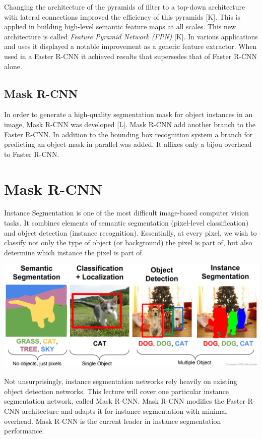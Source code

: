 Changing the architecture of the pyramids of filter to a top-down architecture with lateral connections improved the efficiency of this pyramids [K]. This is applied in building high-level semantic feature maps at all scales. This new architecture is called \emph{ Feature Pyramid Network (FPN)} [K]. In various applications and uses it displayed a notable improvement as a generic feature extractor. When used in a Faster R-CNN it achieved results that supersedes that of Faster R-CNN alone. 

\subsection{Mask R-CNN}\label{s:nnevo-maskrcnn}

In order to generate a high-quality segmentation mask for object instances in an image, Mask R-CNN was developed [L]. Mask R-CNN add another branch to the Faster R-CNN. In addition to the bounding box recognition system a branch for predicting an object mask in parallel was added. It affixes only a bijou overhead to Faster R-CNN.


\section{Mask R-CNN}\label{s:maskrcnn}

Instance Segmentation is one of the most difficult image-based computer vision tasks. It combines elements of semantic segmentation (pixel-level classification) and object detection (instance recognition). Essentially, at every pixel, we wish to classify not only the type of object (or background) the pixel is part of, but also determine which instance the pixel is part of.

\begin{center}
	\includegraphics[scale=0.3]{images/tasks.PNG}
\end{center}

Not unsurprisingly, instance segmentation networks rely heavily on existing object detection networks. This lecture will cover one particular instance segmentation network, called Mask R-CNN. Mask R-CNN modifies the Faster R-CNN architecture and adapts it for instance segmentation with minimal overhead. Mask R-CNN is the current leader in instance segmentation performance.

